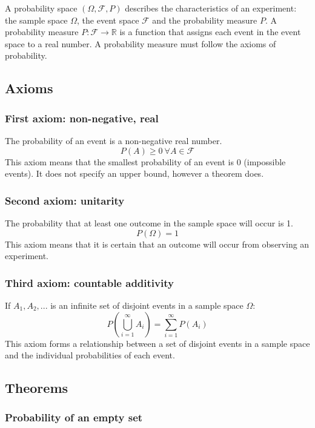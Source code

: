 \documentclass{article}
\begin{document}
A probability space $(\Omega, \mathcal{F}, P)$ describes the characteristics of an experiment: the sample space $\Omega$, the event space $\mathcal{F}$ and the probability measure $P$. A probability measure $P:\mathcal{F}\rightarrow \mathbb{R}$ is a function that assigns each event in the event space to a real number. A probability measure must follow the axioms of probability.

\subsection{Axioms}

\subsubsection{First axiom: non-negative, real}

The probability of an event is a non-negative real number.
\[P(A) \geq 0 \ \forall A \in \mathcal{F}\]
This axiom means that the smallest probability of an event is 0 (impossible events). It does not specify an upper bound, however a theorem does.

\subsubsection{Second axiom: unitarity}

The probability that at least one outcome in the sample space will occur is 1.
\[P(\Omega)=1\]
This axiom means that it is certain that an outcome will occur from observing an experiment.

\subsubsection{Third axiom: countable additivity}

If $A_1, A_2, ...$ is an infinite set of disjoint events in a sample space $\Omega$:
\[P(\bigcup_{i=1}^\infty A_i) = \sum_{i=1}^\infty P(A_i)\]
This axiom forms a relationship between a set of disjoint events in a sample space and the individual probabilities of each event.

\subsection{Theorems}

\subsubsection{Probability of an empty set}
\end{document}
